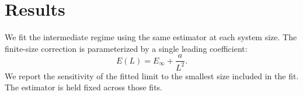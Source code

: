 \section{Results}
We fit the intermediate regime using the same estimator at each system size.
The finite-size correction is parameterized by a single leading coefficient:
\begin{equation}
  E(L) = E_{\infty} + \frac{a}{L^2}.
  \label{eq:scaling}
\end{equation}
We report the sensitivity of the fitted limit to the smallest size included
in the fit. The estimator is held fixed across those fits.
